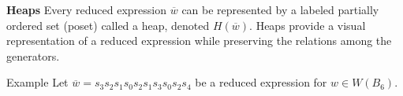 \documentclass{beamer}
\newcommand{\w}{\overline{w}}
\newcommand\heapblock[4]{\fill[fill=#4, fill opacity=0.35, draw=#4, line width=1.1pt, rounded corners,shift={(\xxaxis:#1)},shift={(\yyaxis:#2)}] (-1,-1) rectangle (1,1);\node at (#1,#2) {\footnotesize $#3$};}
\newcommand\xxaxis{0}
\newcommand\yyaxis{90}
\begin{document}

\begin{frame}{\textbf{Heaps}}
Every reduced expression $\w$ can be represented by a labeled partially ordered set (poset) called a heap, denoted $H(\w)$. Heaps provide a visual representation of a reduced expression while preserving the relations among the generators.

\pause

\begin{block}{Example}
Let $\w=s_3s_2s_1s_0s_2s_1s_3s_0s_2s_4$ be a reduced expression for $w \in W(B_6)$. \pause
\begin{columns}
\begin{column}{0.4\textwidth}
\begin{figure}\centering
{}	
\end{figure}
\end{column}
\pause
\begin{column}{0.4\textwidth}
\begin{figure}\centering
{}
\end{figure}	
\end{column}
\end{columns}
\end{block}
	
\end{frame}
\end{document}
